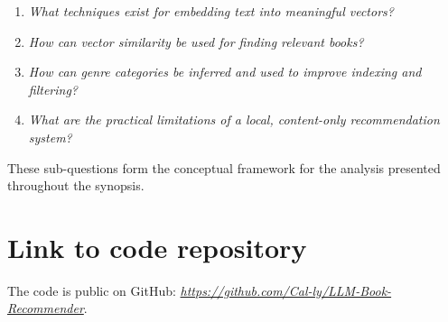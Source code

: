 \begin{enumerate}
    \item \label{itm:subq-embedding} \textit{What techniques exist for embedding text into meaningful vectors?}
    \item \label{itm:subq-similarity} \textit{How can vector similarity be used for finding relevant books?}
    \item \label{itm:subq-classification} \textit{How can genre categories be inferred and used to improve indexing and filtering?}
    \item \label{itm:subq-limitations} \textit{What are the practical limitations of a local, content-only recommendation system?}
\end{enumerate}

These sub-questions form the conceptual framework for the analysis presented throughout the synopsis.

\section{Link to code repository}
The code is public on GitHub: \href{https://github.com/Cal-ly/LLM-Book-Recommender}{\textit{https://github.com/Cal-ly/LLM-Book-Recommender}}.
